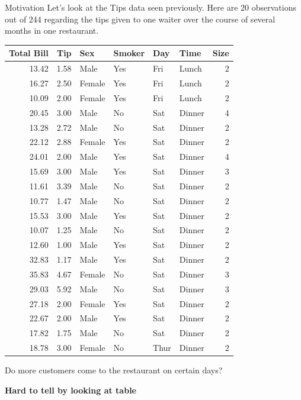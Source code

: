 \documentclass{beamer}
\begin{document}
\begin{frame}{Motivation}
Let's look at the Tips data seen previously. Here are 20 observations out of 244 regarding the tips given to one waiter over the course of several months in one restaurant.

\begin{table}[ht]
\tiny
\centering
\begin{tabular}{rrllllr}
  \hline
Total Bill & Tip & Sex & Smoker & Day & Time & Size \\ 
  \hline
13.42 & 1.58 & Male & Yes & Fri & Lunch &   2 \\ 
  16.27 & 2.50 & Female & Yes & Fri & Lunch &   2 \\ 
  10.09 & 2.00 & Female & Yes & Fri & Lunch &   2 \\ 
  20.45 & 3.00 & Male & No & Sat & Dinner &   4 \\ 
  13.28 & 2.72 & Male & No & Sat & Dinner &   2 \\ 
  22.12 & 2.88 & Female & Yes & Sat & Dinner &   2 \\ 
  24.01 & 2.00 & Male & Yes & Sat & Dinner &   4 \\ 
  15.69 & 3.00 & Male & Yes & Sat & Dinner &   3 \\ 
  11.61 & 3.39 & Male & No & Sat & Dinner &   2 \\ 
  10.77 & 1.47 & Male & No & Sat & Dinner &   2 \\ 
  15.53 & 3.00 & Male & Yes & Sat & Dinner &   2 \\ 
  10.07 & 1.25 & Male & No & Sat & Dinner &   2 \\ 
  12.60 & 1.00 & Male & Yes & Sat & Dinner &   2 \\ 
  32.83 & 1.17 & Male & Yes & Sat & Dinner &   2 \\ 
  35.83 & 4.67 & Female & No & Sat & Dinner &   3 \\ 
  29.03 & 5.92 & Male & No & Sat & Dinner &   3 \\ 
  27.18 & 2.00 & Female & Yes & Sat & Dinner &   2 \\ 
  22.67 & 2.00 & Male & Yes & Sat & Dinner &   2 \\ 
  17.82 & 1.75 & Male & No & Sat & Dinner &   2 \\ 
  18.78 & 3.00 & Female & No & Thur & Dinner &   2 \\ 
   \hline
\end{tabular}
\end{table}
Do more customers come to the restaurant on certain days? 

\textbf{Hard to tell by looking at table}
\end{frame}
\end{document}

